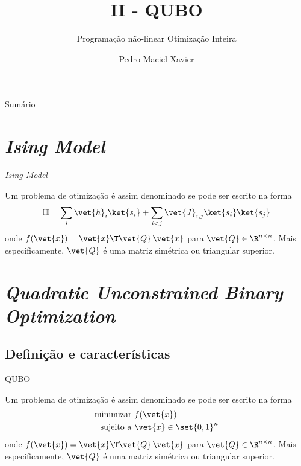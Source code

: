 \documentclass[brazil, MathSerif, aspectratio = 169]{beamer}
\author[Pedro]
{Pedro Maciel Xavier}
\title{II - QUBO}
\subtitle{\small Programação não-linear \textbullet{} Otimização Inteira}
\begin{document}
%
%
\begin{frame}%
    {Sumário}
    \tableofcontents
\end{frame}

\hidelogo

\section{\emph{Ising Model}}

\begin{frame}{\emph{Ising Model}}
    \begin{definition}
        Um problema de otimização é assim denominado se pode ser escrito na forma 
        \begin{align*}
            \mathbb{H} = \sum_{i} \vet{h}_{i} \ket{s_i} + \sum_{i < j} \vet{J}_{i, j} \ket{s_{i}} \ket{s_{j}}
        \end{align*}
        onde $f(\vet{x}) = \vet{x}\T \vet{Q}\, \vet{x}$ para $\vet{Q} \in \R^{n \times n}$. Mais especificamente, $\vet{Q}$ é uma matriz simétrica ou triangular superior.
    \end{definition}  
\end{frame}

\section{\emph{Quadratic Unconstrained Binary Optimization}}

\subsection{Definição e características}

\begin{frame}{QUBO}
    \begin{definition}
        Um problema de otimização é assim denominado se pode ser escrito na forma 
        \begin{align*}
            \text{minimizar } &f(\vet{x})\\
            \text{sujeito a } &\vet{x} \in \set{0, 1}^{n}
        \end{align*}
        onde $f(\vet{x}) = \vet{x}\T \vet{Q}\, \vet{x}$ para $\vet{Q} \in \R^{n \times n}$. Mais especificamente, $\vet{Q}$ é uma matriz simétrica ou triangular superior.
    \end{definition}    
\end{frame}
\end{document}

